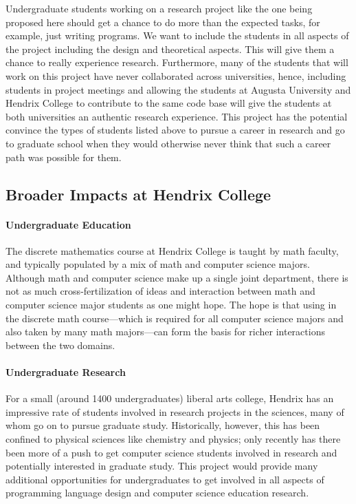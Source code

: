 Undergraduate students working on a research project like the one
being proposed here should get a chance to do more than the expected
tasks, for example, just writing programs.  We want to include the
students in all aspects of the project including the design and
theoretical aspects.  This will give them a chance to really
experience research.  Furthermore, many of the students that will work
on this project have never collaborated across universities, hence,
including students in project meetings and allowing the students at
Augusta University and Hendrix College to contribute to the same code
base will give the students at both universities an authentic research
experience.  This project has the potential convince the types of
students listed above to pursue a career in research and go to
graduate school when they would otherwise never think that such a
career path was possible for them.

\subsection{Broader Impacts at Hendrix College}
\label{subsec:broader_impacts_at_hendrix_college}

\paragraph{Undergraduate Education}  The discrete mathematics course at Hendrix
College is taught by math faculty, and typically populated by a mix of
math and computer science majors.  Although math and computer science
make up a single joint department, there is not as much
cross-fertilization of ideas and interaction between math and computer
science major students as one might hope.  The hope is that
using \thelang in the discrete math course---which is required for all
computer science majors and also taken by many math majors---can form
the basis for richer interactions between the two domains.

\paragraph{Undergraduate Research}  For a small (around 1400
undergraduates) liberal arts college, Hendrix has an impressive rate
of students involved in research projects in the sciences, many of
whom go on to pursue graduate study.  Historically, however, this has
been confined to physical sciences like chemistry and physics; only
recently has there been more of a push to get computer science
students involved in research and potentially interested in graduate
study.  This project would provide many additional opportunities for
undergraduates to get involved in all aspects of programming language
design and computer science education research.
